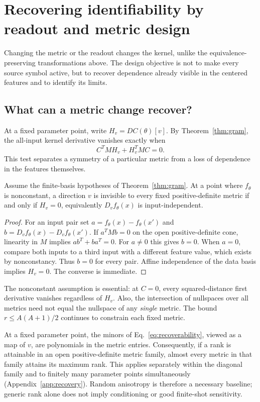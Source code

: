\section{Recovering identifiability by readout and metric design}
\label{sec:recovery}
Changing the metric or the readout changes the kernel, unlike the
equivalence-preserving transformations above. The design objective is
not to make every source symbol active, but to recover dependence
already visible in the centered features and to identify its limits.

\subsection{What can a metric change recover?}
At a fixed parameter point, write $H_v=D C(\theta)[v]$. By
Theorem~\ref{thm:gram}, the all-input kernel derivative vanishes exactly
when
\begin{equation}
 C^T M H_v+H_v^T M C=0.\label{eq:recoverability}
\end{equation}
This test separates a symmetry of a particular metric from a loss of
dependence in the features themselves.

\begin{proposition}
\label{prop:metricrecover}
Assume the finite-basis hypotheses of Theorem~\ref{thm:gram}. At a
point where $f_\theta$ is nonconstant, a direction $v$ is invisible to
every fixed positive-definite metric if and only if $H_v=0$,
equivalently $D_v f_\theta(x)$ is input-independent.
\end{proposition}
\begin{proof}
For an input pair set $a=f_\theta(x)-f_\theta(x')$ and
$b=D_v f_\theta(x)-D_v f_\theta(x')$. If $a^TMb=0$ on the open
positive-definite cone, linearity in $M$ implies
$ab^T+ba^T=0$. For $a\ne0$ this gives $b=0$. When $a=0$, compare
both inputs to a third input with a different feature value, which
exists by nonconstancy. Thus $b=0$ for every pair. Affine independence
of the data basis implies $H_v=0$. The converse is immediate.
\end{proof}
The nonconstant assumption is essential: at $C=0$, every
squared-distance first derivative vanishes regardless of $H_v$.
Also, the intersection of nullspaces over all metrics need not equal
the nullspace of any \emph{single} metric. The bound
$r\le A(A+1)/2$ continues to constrain each fixed metric.

At a fixed parameter point, the minors of Eq.~\eqref{eq:recoverability},
viewed as a map of $v$, are polynomials in the metric entries.
Consequently, if a rank is attainable in an open positive-definite
metric family, almost every metric in that family attains its maximum
rank. This applies separately within the diagonal family and to
finitely many parameter points simultaneously
(Appendix~\ref{app:recovery}). Random anisotropy is therefore a
necessary baseline; generic rank alone does not imply conditioning
or good finite-shot sensitivity.

